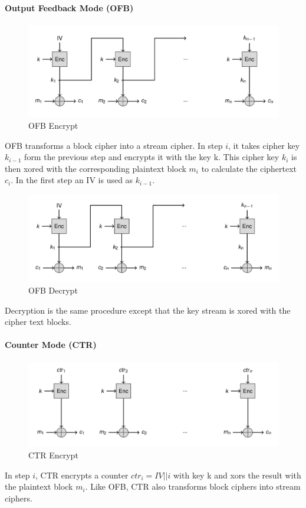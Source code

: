 \paragraph{Output Feedback Mode (OFB)}
\begin{figure}[H]
  \centering
  \includegraphics[width=.8\textwidth]{figures/ofb_encrypt.png}
  \caption{OFB Encrypt}
\end{figure}
OFB transforms a block cipher into a stream cipher.
In step $i$, it takes cipher key $k_{i-1}$ form the previous step and encrypts it with the key k.
This cipher key $k_i$ is then xored with the corresponding plaintext block $m_i$ to calculate the ciphertext $c_i$.
In the first step an IV is used as $k_{i-1}$.

\begin{figure}[H]
  \centering
  \includegraphics[width=.8\textwidth]{figures/ofb_decrypt}
  \caption{OFB Decrypt}
\end{figure}
Decryption is the same procedure except that the key stream is xored with the cipher text blocks.

\paragraph{Counter Mode (CTR)}
\begin{figure}[H]
  \centering
  \includegraphics[width=.8\textwidth]{figures/ctr_encrypt}
  \caption{CTR Encrypt}
\end{figure}
In step $i$, CTR encrypts a counter $ctr_i = IV || i$ with key k and xors the result with the plaintext block $m_i$.
Like OFB, CTR also transforms block ciphers into stream ciphers.

